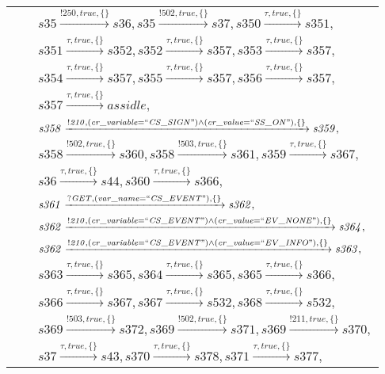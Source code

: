 \begin{tabular}{lcp{350px}}
& & $\mathit{s35}\xrightarrow{\mathit{!250}, \mathit{true}, \{\}}\mathit{s36},\mathit{s35}\xrightarrow{\mathit{!502}, \mathit{true}, \{\}}\mathit{s37},\mathit{s350}\xrightarrow{\mathit{\tau}, \mathit{true}, \{\}}\mathit{s351},$ \\
& & $\mathit{s351}\xrightarrow{\mathit{\tau}, \mathit{true}, \{\}}\mathit{s352},\mathit{s352}\xrightarrow{\mathit{\tau}, \mathit{true}, \{\}}\mathit{s357},\mathit{s353}\xrightarrow{\mathit{\tau}, \mathit{true}, \{\}}\mathit{s357},$ \\
& & $\mathit{s354}\xrightarrow{\mathit{\tau}, \mathit{true}, \{\}}\mathit{s357},\mathit{s355}\xrightarrow{\mathit{\tau}, \mathit{true}, \{\}}\mathit{s357},\mathit{s356}\xrightarrow{\mathit{\tau}, \mathit{true}, \{\}}\mathit{s357},$ \\
& & $\mathit{s357}\xrightarrow{\mathit{\tau}, \mathit{true}, \{\}}\mathit{assidle},$ \\
& & $\mathit{s358}\xrightarrow{\mathit{!210}, \mathit{(cr\_variable = ``CS\_SIGN") \land (cr\_value = ``SS\_ON")}, \{\}}\mathit{s359},$ \\
& & $\mathit{s358}\xrightarrow{\mathit{!502}, \mathit{true}, \{\}}\mathit{s360},\mathit{s358}\xrightarrow{\mathit{!503}, \mathit{true}, \{\}}\mathit{s361},\mathit{s359}\xrightarrow{\mathit{\tau}, \mathit{true}, \{\}}\mathit{s367},$ \\
& & $\mathit{s36}\xrightarrow{\mathit{\tau}, \mathit{true}, \{\}}\mathit{s44},\mathit{s360}\xrightarrow{\mathit{\tau}, \mathit{true}, \{\}}\mathit{s366},$ \\
& & $\mathit{s361}\xrightarrow{\mathit{?GET}, \mathit{(var\_name = ``CS\_EVENT")}, \{\}}\mathit{s362},$ \\
& & $\mathit{s362}\xrightarrow{\mathit{!210}, \mathit{(cr\_variable = ``CS\_EVENT") \land (cr\_value = ``EV\_NONE")}, \{\}}\mathit{s364},$ \\
& & $\mathit{s362}\xrightarrow{\mathit{!210}, \mathit{(cr\_variable = ``CS\_EVENT") \land (cr\_value = ``EV\_INFO")}, \{\}}\mathit{s363},$ \\
& & $\mathit{s363}\xrightarrow{\mathit{\tau}, \mathit{true}, \{\}}\mathit{s365},\mathit{s364}\xrightarrow{\mathit{\tau}, \mathit{true}, \{\}}\mathit{s365},\mathit{s365}\xrightarrow{\mathit{\tau}, \mathit{true}, \{\}}\mathit{s366},$ \\
& & $\mathit{s366}\xrightarrow{\mathit{\tau}, \mathit{true}, \{\}}\mathit{s367},\mathit{s367}\xrightarrow{\mathit{\tau}, \mathit{true}, \{\}}\mathit{s532},\mathit{s368}\xrightarrow{\mathit{\tau}, \mathit{true}, \{\}}\mathit{s532},$ \\
& & $\mathit{s369}\xrightarrow{\mathit{!503}, \mathit{true}, \{\}}\mathit{s372},\mathit{s369}\xrightarrow{\mathit{!502}, \mathit{true}, \{\}}\mathit{s371},\mathit{s369}\xrightarrow{\mathit{!211}, \mathit{true}, \{\}}\mathit{s370},$ \\
& & $\mathit{s37}\xrightarrow{\mathit{\tau}, \mathit{true}, \{\}}\mathit{s43},\mathit{s370}\xrightarrow{\mathit{\tau}, \mathit{true}, \{\}}\mathit{s378},\mathit{s371}\xrightarrow{\mathit{\tau}, \mathit{true}, \{\}}\mathit{s377},$ \\
\end{tabular}

